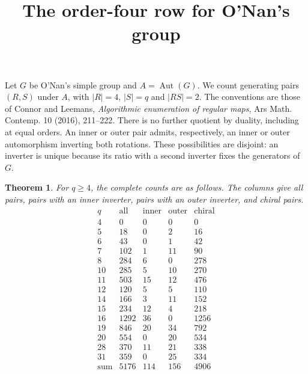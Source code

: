 \documentclass[11pt]{article}
\title{The order-four row for O'Nan's group}
\author{}\date{}
\newtheorem{theorem}{Theorem}
\newcommand{\Aut}{\operatorname{Aut}}
\begin{document}
\maketitle
Let $G$ be O'Nan's simple group and $A=\Aut(G)$. We count generating
pairs $(R,S)$ under $A$, with $|R|=4$, $|S|=q$ and $|RS|=2$.
The conventions are those of Connor and Leemans, \emph{Algorithmic
enumeration of regular maps}, Ars Math. Contemp. 10 (2016), 211--222.
There is no further quotient by duality, including at equal orders.
An inner or outer pair admits, respectively, an inner or outer
automorphism inverting both rotations. These possibilities are disjoint:
an inverter is unique because its ratio with a second inverter fixes
the generators of $G$.

\begin{theorem}
For $q\ge4$, the complete counts are as follows. The columns give all
pairs, pairs with an inner inverter, pairs with an outer inverter,
and chiral pairs.
\[
\begin{array}{r|rrrr}
q&\mathrm{all}&\mathrm{inner}&\mathrm{outer}&\mathrm{chiral}\\\hline
4&0&0&0&0\\
5&18&0&2&16\\
6&43&0&1&42\\
7&102&1&11&90\\
8&284&6&0&278\\
10&285&5&10&270\\
11&503&15&12&476\\
12&120&5&5&110\\
14&166&3&11&152\\
15&234&12&4&218\\
16&1292&36&0&1256\\
19&846&20&34&792\\
20&554&0&20&534\\
28&370&11&21&338\\
31&359&0&25&334\\
\hline
\mathrm{sum}&5176&114&156&4906
\end{array}
\]
\end{theorem}
\end{document}
